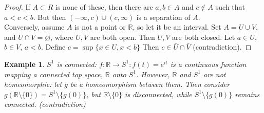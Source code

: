 \documentclass{article}
\newcommand{\R}{\mathbb{R}}
\newtheorem{example}{Example}
\begin{document}
\begin{proof}
	If $A\subset R$ is none of these, then there are $a,b \in A$ and $c\not\in A$ such that $a<c<b$.  But then $(-\infty,c)\cup(c,\infty)$ is a separation of $A$.\\Conversely, assume $A$ is not a point or $\R$, so let it be an interval.  Set $A=U\cup V$, and $U\cap V=\varnothing$, where $U,V$ are both open.  Then $U,V$ are both closed.  Let $a\in U$, $b\in V$, $a<b$.  Define $c=\sup\{x\in U,x<b\}$ Then $c\in \bar{U}\cap\bar{V}$ (contradiction).
	\end{proof}
\begin{example}
	$S^1$ is connected: $f: \R\rightarrow S^1: f(t) = e^{it}$ is a continuous function mapping a connected top space, $\R$ onto $S^1$.
	However, $\R$ and $S^1$ are not homeomorphic: let $g$ be a homeomorphism between them.  Then consider $g(\R\setminus\{0\}) = S^1\setminus\{g(0)\}$, but $\R\setminus\{0\}$ is disconnected, while $S^1\setminus\{g(0)\}$ remains connected. (contradiction)
\end{example}
 
\end{document}
